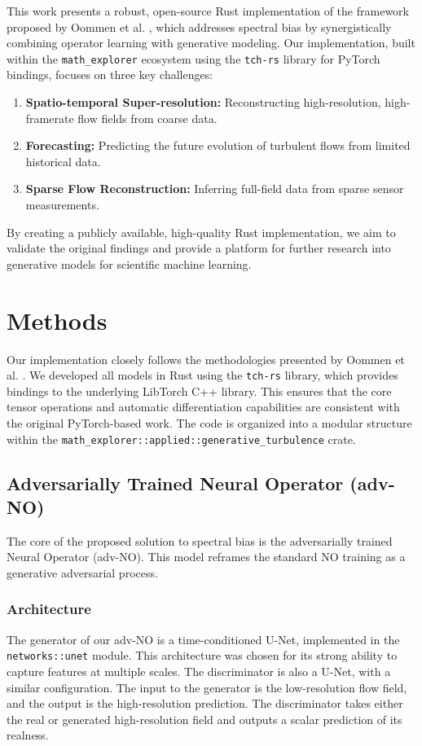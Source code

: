 \documentclass{article}
\begin{document}
This work presents a robust, open-source Rust implementation of the framework proposed by Oommen et al. \cite{oommen2025integrating}, which addresses spectral bias by synergistically combining operator learning with generative modeling. Our implementation, built within the \texttt{math\_explorer} ecosystem using the \texttt{tch-rs} library for PyTorch bindings, focuses on three key challenges:
\begin{enumerate}
    \item \textbf{Spatio-temporal Super-resolution:} Reconstructing high-resolution, high-framerate flow fields from coarse data.
    \item \textbf{Forecasting:} Predicting the future evolution of turbulent flows from limited historical data.
    \item \textbf{Sparse Flow Reconstruction:} Inferring full-field data from sparse sensor measurements.
\end{enumerate}
By creating a publicly available, high-quality Rust implementation, we aim to validate the original findings and provide a platform for further research into generative models for scientific machine learning.

\section{Methods}
Our implementation closely follows the methodologies presented by Oommen et al. \cite{oommen2025integrating}. We developed all models in Rust using the \texttt{tch-rs} library, which provides bindings to the underlying LibTorch C++ library. This ensures that the core tensor operations and automatic differentiation capabilities are consistent with the original PyTorch-based work. The code is organized into a modular structure within the \texttt{math\_explorer::applied::generative\_turbulence} crate.

\subsection{Adversarially Trained Neural Operator (adv-NO)}
The core of the proposed solution to spectral bias is the adversarially trained Neural Operator (adv-NO). This model reframes the standard NO training as a generative adversarial process.

\subsubsection{Architecture}
The generator of our adv-NO is a time-conditioned U-Net, implemented in the \texttt{networks::unet} module. This architecture was chosen for its strong ability to capture features at multiple scales. The discriminator is also a U-Net, with a similar configuration. The input to the generator is the low-resolution flow field, and the output is the high-resolution prediction. The discriminator takes either the real or generated high-resolution field and outputs a scalar prediction of its realness.
\end{document}
